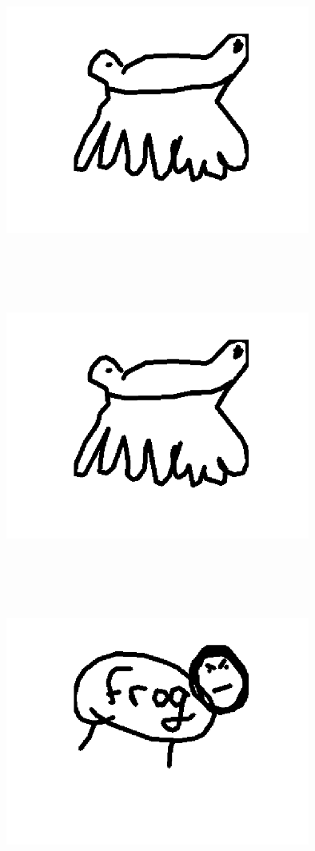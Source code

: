 \begin{multicols}{4}
\includegraphics[width=10cm,height=10cm,keepaspectratio]{figures/frog_draw_1.png}
\includegraphics[width=10cm,height=10cm,keepaspectratio]{figures/frog_draw_1.png}
\includegraphics[width=10cm,height=10cm,keepaspectratio]{figures/frog_draw_2.png}


\end{multicols}
